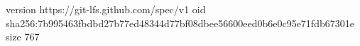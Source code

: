 version https://git-lfs.github.com/spec/v1
oid sha256:7b995463fbdbd27b77ed48344d77bf08dbee56600eed0b6e0c95e71fdb67301e
size 767
